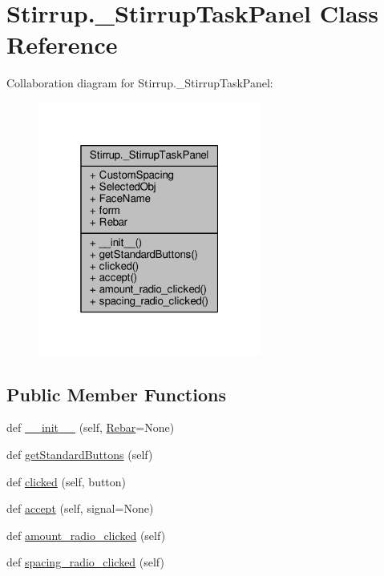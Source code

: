 \hypertarget{classStirrup_1_1__StirrupTaskPanel}{}\section{Stirrup.\+\_\+\+Stirrup\+Task\+Panel Class Reference}
\label{classStirrup_1_1__StirrupTaskPanel}


Collaboration diagram for Stirrup.\+\_\+\+Stirrup\+Task\+Panel\+:\nopagebreak
\begin{figure}[H]
\begin{center}
\leavevmode
\includegraphics[width=208pt]{classStirrup_1_1__StirrupTaskPanel__coll__graph}
\end{center}
\end{figure}
\subsection*{Public Member Functions}
\begin{DoxyCompactItemize}
\item 
def \hyperlink{classStirrup_1_1__StirrupTaskPanel_a87e3632f8c08964f97ec549d8d156572}{\+\_\+\+\_\+init\+\_\+\+\_\+} (self, \hyperlink{classStirrup_1_1__StirrupTaskPanel_a004a341f992f38ca54893edf92f85faa}{Rebar}=None)
\item 
def \hyperlink{classStirrup_1_1__StirrupTaskPanel_a517a35306c1eedd497869edb78b53b8b}{get\+Standard\+Buttons} (self)
\item 
def \hyperlink{classStirrup_1_1__StirrupTaskPanel_aa1caeff48053cc3a43ed215e5c5c01c8}{clicked} (self, button)
\item 
def \hyperlink{classStirrup_1_1__StirrupTaskPanel_a49957596860a74388ec2e64535eacbc6}{accept} (self, signal=None)
\item 
def \hyperlink{classStirrup_1_1__StirrupTaskPanel_acf38bd6966c793e88ebc0d5d01db3148}{amount\+\_\+radio\+\_\+clicked} (self)
\item 
def \hyperlink{classStirrup_1_1__StirrupTaskPanel_ac091360b77eb8b65a0f520af0d2c4584}{spacing\+\_\+radio\+\_\+clicked} (self)
\end{DoxyCompactItemize}
